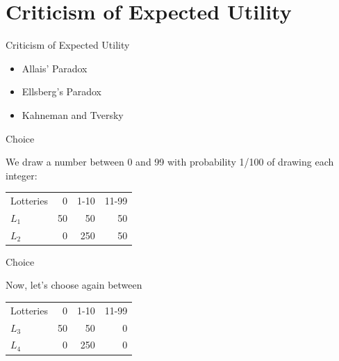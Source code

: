 \documentclass[handout]{beamer}
\begin{document}
\section{Criticism of Expected Utility}



\begin{frame}{Criticism of Expected Utility}
\begin{itemize}
\item Allais' Paradox
\item Ellsberg's Paradox
\item Kahneman and Tversky
\end{itemize}
\end{frame}


\begin{frame}{Choice}


We draw a number between 0 and 99 with probability 1/100 of drawing each integer: 

\begin{table}[H]
\begin{tabular}{lrrr}
\hline \hline
Lotteries & 0 & 1-10 & 11-99 \\
$L_1$ & 50 & 50 & 50 \\
$L_2$ & 0 & 250 & 50 \\
\hline \hline 
\end{tabular}
\end{table} 


\end{frame}

\begin{frame}{Choice}

Now, let's choose again between

\begin{table}[H]
\begin{tabular}{lrrr}
\hline \hline
Lotteries & 0 & 1-10 & 11-99 \\
$L_3$ & 50 & 50 & 0 \\
$L_4$ & 0 & 250 & 0 \\
\hline \hline 
\end{tabular}
\end{table} 

\end{frame}
\end{document}
